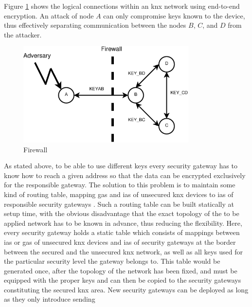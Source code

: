Figure \ref{fig:firewall} shows the logical connections within an \gls{knx} network using end-to-end encryption. An 
attack of node $A$ can only compromise keys known to the device, thus effectively separating communication between the nodes $B$, $C$, and $D$ from
the attacker. 
\begin{figure}
  \centering
    \includegraphics[width=0.8\textwidth]{figures/firewall2.eps}
% 
 \caption{Firewall}
 \label{fig:firewall}
\end{figure}
As stated above, to be able to use different keys every security gateway has to know how to reach a given address so that the data can be encrypted
exclusively for the responsible gateway. The solution to this problem is to maintain some kind of routing table, mapping \glspl{ga} and \glspl{ia} of unsecured
\gls{knx} devices to \glspl{ia} of responsible security gateways	.
Such a routing table can be built statically at setup time, with the obvious disadvantage
that the exact topology of the to be applied network has to be known in advance, thus reducing the flexibility. Here, every security gateway holds a static 
table which consists of mappings between \glspl{ia} or \glspl{ga} of unsecured \gls{knx} devices and \glspl{ia} of security gateways at the border
between the secured and the unsecured \gls{knx} network, as well as all keys used for the particular security level the gateway belongs to.
This table would be generated once, after the topology of the network has been fixed, and must be equipped with the proper keys and can then
be copied to the security gateways constituting the secured \gls{knx} area. New security gateways can be deployed as long as they only introduce sending 
